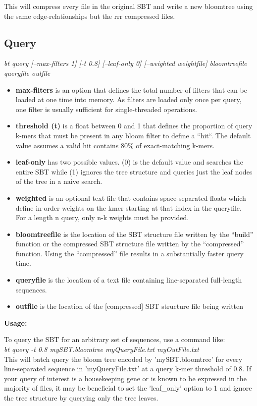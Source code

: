 \documentclass{article}
\begin{document}
This will compress every file in the original SBT and write a new bloomtree using the same edge-relationships but the rrr compressed files.


\subsection{Query}
\textit{bt query [--max-filters 1] [-t 0.8] [--leaf-only 0] [--weighted weightfile] bloomtreefile queryfile outfile}
\begin{itemize}
\item \textbf{max-filters} is an option that defines the total number of filters that can be loaded at one time into memory. As filters are loaded only once per query, one filter is usually sufficient for single-threaded operations.
\item \textbf{threshold (t)} is a float between 0 and 1 that defines the proportion of query k-mers that must be present in any bloom filter to define a ``hit``. The default value assumes a valid hit contains 80\% of exact-matching k-mers.
\item \textbf{leaf-only} has two possible values. (0) is the default value and searches the entire SBT while (1) ignores the tree structure and queries just the leaf nodes of the tree in a naive search.
\item \textbf{weighted} is an optional text file that contains space-separated floats which define in-order weights on the kmer starting at that index in the queryfile. For a length n query, only n-k weights must be provided.
\item \textbf{bloomtreefile} is the location of the SBT structure file written by the ``build'' function or the compressed SBT structure file written by the ``compressed'' function. Using the ``compressed'' file results in a substantially faster query time.
\item \textbf{queryfile} is the location of a text file containing line-separated full-length sequences.
\item \textbf{outfile} is the location of the [compressed] SBT structure file being written
\end{itemize}
\textbf{Usage:}

To query the SBT for an arbitrary set of sequences, use a command like: \\

\textit{bt query -t 0.8 mySBT.bloomtree myQueryFile.txt myOutFile.txt} \\

This will batch query the bloom tree encoded by 'mySBT.bloomtree' for every line-separated sequence in 'myQueryFile.txt' at a query k-mer threshold of 0.8. If your query of interest is a housekeeping gene or is known to be expressed in the majority of files, it may be beneficial to set the 'leaf\_only' option to 1 and ignore the tree structure by querying only the tree leaves. 
\end{document}
